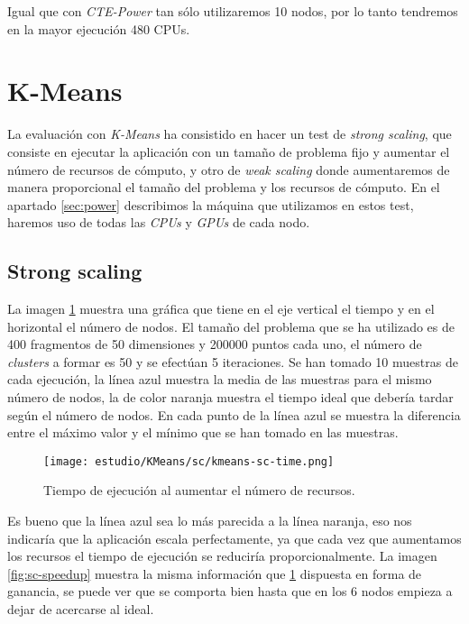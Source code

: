 Igual que con \textit{CTE-Power} tan sólo utilizaremos 10  nodos, por lo tanto tendremos en la mayor ejecución 480 CPUs.

\section{K-Means}

La evaluación con \textit{K-Means} ha consistido en hacer un test de \textit{strong scaling}, que consiste en ejecutar la aplicación con un tamaño de problema fijo y aumentar el número de recursos de cómputo, y otro de \textit{weak scaling} donde aumentaremos de manera proporcional el tamaño del problema y los recursos de cómputo. En el apartado \ref{sec:power} describimos la máquina que utilizamos en estos test, haremos uso de todas las \textit{CPUs} y \textit{GPUs} de cada nodo.

\subsection{Strong scaling}

La imagen \ref{fig:sc-time} muestra una gráfica que tiene en el eje vertical el tiempo y en el horizontal el número de nodos. El tamaño del problema que se ha utilizado es de 400 fragmentos de 50 dimensiones y 200000 puntos cada uno, el número de \textit{clusters} a formar es 50 y se efectúan 5 iteraciones. Se han tomado 10 muestras de cada ejecución, la línea azul muestra la media de las muestras para el mismo número de nodos, la de color naranja muestra el tiempo ideal que debería tardar según el número de nodos. En cada punto de la línea azul se muestra la diferencia entre el máximo valor y el mínimo que se han tomado en las muestras.

\begin{figure}[H]
	\centering 
	\caption{Tiempo de ejecución al aumentar el número de recursos.}
	\texttt{[image: estudio/KMeans/sc/kmeans-sc-time.png]}
	\label{fig:sc-time}
\end{figure}

Es bueno que la línea azul sea lo más parecida a la línea naranja, eso nos indicaría que la aplicación escala perfectamente, ya que cada vez que aumentamos los recursos el tiempo de ejecución se reduciría proporcionalmente. La imagen \ref{fig:sc-speedup} muestra la misma información que \ref{fig:sc-time} dispuesta en forma de ganancia, se puede ver que se comporta bien hasta que en los 6 nodos empieza a dejar de acercarse al ideal.

